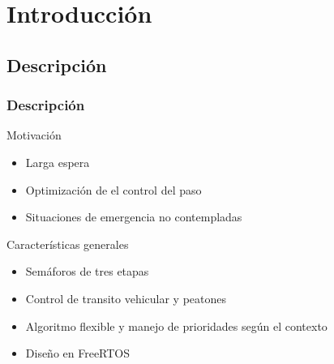 \section{Introducción} 

\subsection{Descripción}

\begin{frame}
	\frametitle{Descripción}
	
		\begin{block}{Motivación}
			\begin{itemize}
				\item Larga espera
				\item Optimización de el control del paso
				\item Situaciones de emergencia no contempladas
			\end{itemize}
		\end{block}

		\begin{block}{Características generales}
			\begin{itemize}
				\item Semáforos de tres etapas
				\item Control de transito vehicular y peatones
				\item Algoritmo flexible y manejo de prioridades según el contexto
				\item Diseño en FreeRTOS
			\end{itemize}
		\end{block}

\end{frame}


